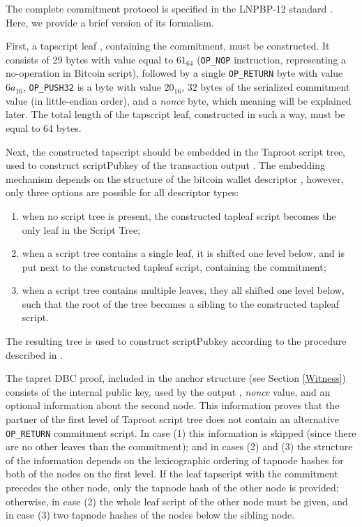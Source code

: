 \documentclass[9pt,oneside]{amsart}
\begin{document}
\begin{multicols}{2}
The complete commitment protocol is specified in the LNPBP-12 standard \cite{LNPBP12}.
Here, we provide a brief version of its formalism.

First, a tapscript leaf \cite{BIP342}, containing the commitment, must be constructed.
It consists of 29 bytes with value equal to $61_{64}$
(\verb|OP_NOP| instruction, representing a no-operation in Bitcoin script),
followed by a single \verb|OP_RETURN| byte with value $6a_{16}$,
\verb|OP_PUSH32| is a byte with value $20_{16}$,
32 bytes of the serialized commitment value (in little-endian order),
and a \emph{nonce} byte, which meaning will be explained later.
The total length of the tapscript leaf, constructed in such a way, must be equal to 64 bytes.

Next, the constructed tapscript should be embedded in the Taproot script tree,
used to construct \textsf{scriptPubkey} of the transaction output \cite{BIP341}.
The embedding mechanism depends on the structure of the bitcoin wallet descriptor \cite{BIP380},
however, only three options are possible for all descriptor types:
\noindent
\begin{enumerate}
\item when no script tree is present,
    the constructed tapleaf script becomes the only leaf in the Script Tree;
\item when a script tree contains a single leaf, it is shifted one level below,
    and is put next to the constructed tapleaf script, containing the commitment;
\item when a script tree contains multiple leaves, they all shifted one level below,
    such that the root of the tree becomes a sibling to the constructed tapleaf script.
\end{enumerate}
\noindent
The resulting tree is used to construct \textsf{scriptPubkey}
according to the procedure described in \cite{BIP341}.

The tapret DBC proof, included in the anchor structure (see Section \ref{Witness})
consists of the internal public key, used by the output \cite{BIP341},
\emph{nonce} value, and an optional information about the second node.
This information proves that the partner of the first level of Taproot script tree
does not contain an alternative \verb|OP_RETURN| commitment script.
In case (1) this information is skipped (since there are no other leaves than the commitment);
and in cases (2) and (3) the structure of the information depends on the lexicographic ordering
of tapnode hashes \cite{BIP341} for both of the nodes on the first level.
If the leaf tapscript with the commitment precedes the other node,
only the tapnode hash of the other node is provided;
otherwise, in case (2) the whole leaf script of the other node must be given,
and in case (3) two tapnode hashes of the nodes below the sibling node.


\end{multicols}
\end{document}

